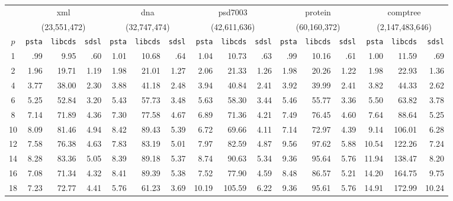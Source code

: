 \setlength{\tabcolsep}{3pt}
\begin{table}[ht]
  \centering
  \begin{tabular}{crrrrrrrrrrrrrrr}
    & \multicolumn{3}{c}{xml} & \multicolumn{3}{c}{dna} & \multicolumn{3}{c}{psd7003} & \multicolumn{3}{c}{protein} & \multicolumn{3}{c}{comptree}\\
    &  \multicolumn{3}{c}{(23,551,472)} & \multicolumn{3}{c}{(32,747,474)} & \multicolumn{3}{c}{(42,611,636)} & \multicolumn{3}{c}{(60,160,372)} & \multicolumn{3}{c}{(2,147,483,646)}\\
\hline
    $p$ & \verb|psta| & \verb|libcds| & \verb|sdsl|  & \verb|psta| & \verb|libcds| & \verb|sdsl| & \verb|psta| & \verb|libcds| & \verb|sdsl| & \verb|psta| & \verb|libcds| & \verb|sdsl| & \verb|psta| & \verb|libcds| & \verb|sdsl|\\
\hline
 1   &  .99  &  9.95  & .60  &  1.01 & 10.68  & .64  &  1.04  & 10.73  & .63  &  .99   &  10.16  &  .61   & 1.00  & 11.59  & .69   \\
 2   &  1.96 &  19.71 & 1.19 &  1.98 & 21.01  & 1.27 &  2.06  & 21.33  & 1.26 &  1.98  &  20.26  &  1.22  & 1.98  & 22.93  & 1.36  \\
 4   &  3.77 &  38.00 & 2.30 &  3.88 & 41.18  & 2.48 &  3.94  & 40.84  & 2.41 &  3.92  &  39.99  &  2.41  & 3.82  & 44.33  & 2.62  \\
 6   &  5.25 &  52.84 & 3.20 &  5.43 & 57.73  & 3.48 &  5.63  & 58.30  & 3.44 &  5.46  &  55.77  &  3.36  & 5.50  & 63.82  & 3.78  \\
 8   &  7.14 &  71.89 & 4.36 &  7.30 & 77.58  & 4.67 &  6.89  & 71.36  & 4.21 &  7.49  &  76.45  &  4.60  & 7.64  & 88.64  & 5.25  \\
 10  &  8.09 &  81.46 & 4.94 &  8.42 & 89.43  & 5.39 &  6.72  & 69.66  & 4.11 &  7.14  &  72.97  &  4.39  & 9.14  & 106.01 & 6.28  \\
 12  &  7.58 &  76.38 & 4.63 &  7.83 & 83.19  & 5.01 &  7.97  & 82.59  & 4.87 &  9.56  &  97.62  &  5.88  & 10.54 & 122.26 & 7.24  \\
 14  &  8.28 &  83.36 & 5.05 &  8.39 & 89.18  & 5.37 &  8.74  & 90.63  & 5.34 &  9.36  &  95.64  &  5.76  & 11.94 & 138.47 & 8.20  \\
 16  &  7.08 &  71.34 & 4.32 &  8.41 & 89.39  & 5.38 &  7.52  & 77.90  & 4.59 &  8.48  &  86.57  &  5.21  & 14.20 & 164.75 & 9.75  \\
\hline\hline
 18  &  7.23 &  72.77 & 4.41 &  5.76 & 61.23  & 3.69 &  10.19 & 105.59 & 6.22 &  9.36  &  95.61  &  5.76  & 14.91 & 172.99 & 10.24\\

\end{tabular}
\end{table}
